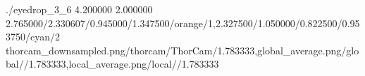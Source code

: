 \TrioComparisonFigure
    {./eyedrop_3_6}
    {4.200000}
    {2.000000}
    {2.765000/2.330607/0.945000/1.347500/orange/1,2.327500/1.050000/0.822500/0.953750/cyan/2}
    {thorcam_downsampled.png/thorcam/ThorCam/1.783333,global_average.png/global//1.783333,local_average.png/local//1.783333}
